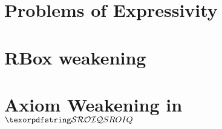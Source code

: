 \section{Problems of Expressivity} \label{expressivity-problems}



\section{RBox weakening} \label{rbox-weakening}



\section{Axiom Weakening in \texorpdfstring{$\SROIQ$}{SROIQ}} \label{weakening-sroiq}



